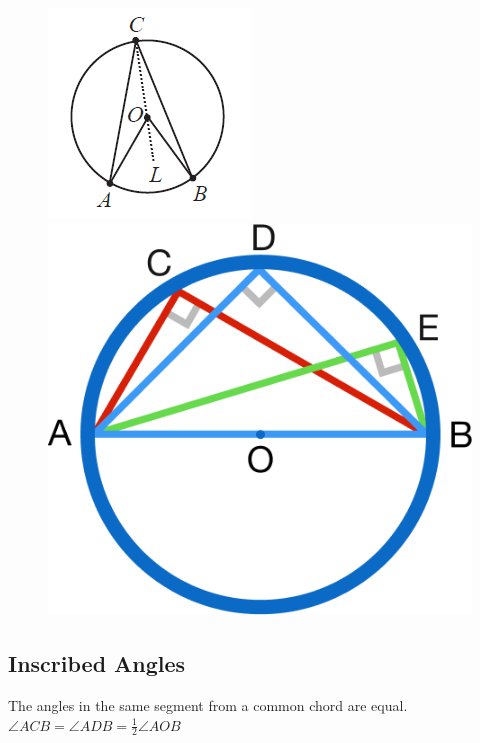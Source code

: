 \documentclass[12pt]{article}
\begin{document}
	\begin{figure}[h!]
		\centering
		\includegraphics[height=0.15\textheight]{Graphics/Week_13/StarTreck.png}
		\includegraphics[height=0.15\textheight]{Graphics/Week_13/ThalesTheorem.png}
	\end{figure}
	\vspace{-5mm}
	
	\subsection{Inscribed Angles}
	The angles in the same segment from a common chord are equal.\\
	$\angle ACB = \angle ADB = \frac{1}{2}\angle AOB$
	
\end{document}

